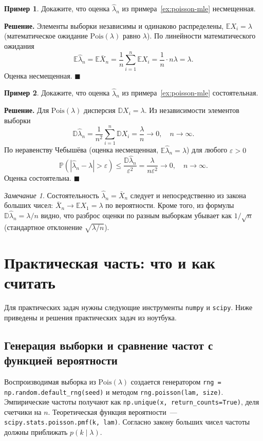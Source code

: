 \documentclass[a4paper,12pt]{article}
\theoremstyle{definition}
\newtheorem{example}{Пример}
\theoremstyle{plain}
\theoremstyle{remark}
\newtheorem*{remark}{Замечание}
\newcommand{\E}{\mathbb{E}}
\newcommand{\D}{\mathbb{D}}
\renewcommand{\P}{\mathbb{P}}
\begin{document}
\begin{example}
Докажите, что оценка $\hat\lambda_n$ из примера~\ref{ex:poisson-mle} несмещенная.
\end{example}

\noindent\textbf{Решение.} Элементы выборки независимы и одинаково распределены, $\E X_i=\lambda$ (математическое ожидание $\mathrm{Pois}(\lambda)$ равно $\lambda$). По линейности математического ожидания
$$\E\hat\lambda_n=\E\bar X_n=\frac1n\sum_{i=1}^n\E X_i=\frac1n\cdot n\lambda=\lambda.$$
Оценка несмещенная. \hfill$\blacksquare$

\begin{example}
Докажите, что оценка $\hat\lambda_n$ из примера~\ref{ex:poisson-mle} состоятельная.
\end{example}

\noindent\textbf{Решение.} Для $\mathrm{Pois}(\lambda)$ дисперсия $\D X_i=\lambda$. Из независимости элементов выборки
$$\D\hat\lambda_n=\frac{1}{n^2}\sum_{i=1}^n\D X_i=\frac{\lambda}{n}\to0,\quad n\to\infty.$$
По неравенству Чебышёва (оценка несмещенная, $\E\hat\lambda_n=\lambda$) для любого $\varepsilon>0$
$$\P\left(|\hat\lambda_n-\lambda|>\varepsilon\right)\le\frac{\D\hat\lambda_n}{\varepsilon^2}=\frac{\lambda}{n\varepsilon^2}\to0,\quad n\to\infty.$$
Оценка состоятельна. \hfill$\blacksquare$

\begin{remark}
Состоятельность $\hat\lambda_n=\bar X_n$ следует и непосредственно из закона больших чисел: $\bar X_n\to\E X_1=\lambda$ по вероятности. Кроме того, из формулы $\D\hat\lambda_n=\lambda/n$ видно, что разброс оценки по разным выборкам убывает как $1/\sqrt n$ (стандартное отклонение $\sqrt{\lambda/n}$).
\end{remark}

\section{Практическая часть: что и как считать}

Для практических задач нужны следующие инструменты \lstinline|numpy| и \lstinline|scipy|. Ниже приведены и решения практических задач из ноутбука.

\subsection{Генерация выборки и сравнение частот с функцией вероятности}

Воспроизводимая выборка из $\mathrm{Pois}(\lambda)$ создается генератором \lstinline|rng = np.random.default_rng(seed)| и методом \lstinline|rng.poisson(lam, size)|. Эмпирические частоты получают как \lstinline|np.unique(x, return_counts=True)|, деля счетчики на $n$. Теоретическая функция вероятности~--- \lstinline|scipy.stats.poisson.pmf(k, lam)|. Согласно закону больших чисел частоты должны приближать $p(k\mid\lambda)$.
\end{document}
